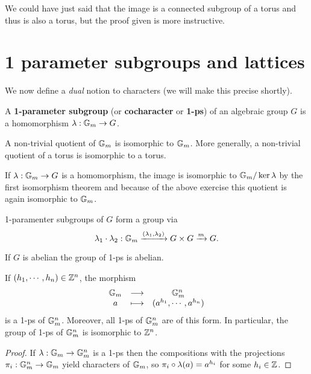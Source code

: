 \begin{remark}
We could have just said that the image is a connected subgroup of a torus and thus is also a torus, but the proof given is more instructive.
\end{remark}



\section{1 parameter subgroups and lattices}

We now define a \textit{dual} notion to characters (we will make this precise shortly).

\begin{definition}
A \textbf{1-parameter subgroup} (or \textbf{cocharacter} or \textbf{1-ps}) of an algebraic group $G$ is a homomorphism $\lambda:\mathbb{G}_m\to G$. 
\end{definition}

\begin{exercise}
A non-trivial quotient of $\mathbb{G}_m$ is isomorphic to $\mathbb{G}_m$. More generally, a non-trivial quotient of a torus is isomorphic to a torus.
\end{exercise}

\begin{remark}
If $\lambda:\mathbb{G}_m\to G$ is a homomorphism, the image is isomorphic to $\mathbb{G}_m/\ker\lambda$ by the first isomorphism theorem and because of the above exercise this quotient is again isomorphic to $\mathbb{G}_m$.
\end{remark}


\begin{remark}
1-paramenter subgroups of $G$ form a group via
\[\lambda_1\cdot \lambda_2:\mathbb{G}_m\xrightarrow{(\lambda_1,\lambda_2)} G\times G\xrightarrow{m}G.\]
\end{remark}

\begin{remark}
If $G$ is abelian the group of 1-ps is abelian.
\end{remark}


\begin{proposition}\label{1psOfTorus}
If $(h_1,\cdots, h_n)\in \mathbb{Z}^n$, the morphism
\[\begin{array}{ccc} {\mathbb{G}_m} & \longrightarrow & {\mathbb{G}_m^n}\\ {a} & \longmapsto & {(a^{h_1},\cdots, a^{h_n})} \end{array}\]
is a 1-ps of $\mathbb{G}_m^n$. Moreover, all 1-ps of $\mathbb{G}_m^n$ are of this form. In particular, the group of 1-ps of $\mathbb{G}_m^n$ is isomorphic to $\mathbb{Z}^n$.
\end{proposition}
\begin{proof}
If $\lambda:\mathbb{G}_m\to\mathbb{G}_m^n$ is a 1-ps then the compositions with the projections $\pi_i:\mathbb{G}^n_m\to \mathbb{G}_m$ yield characters of $\mathbb{G}_m$, so $\pi_i\circ \lambda(a)=a^{h_i}$ for some $h_i\in \mathbb{Z}$.
\end{proof}

